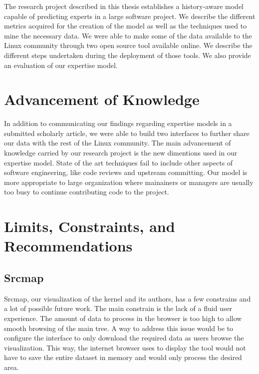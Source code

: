 \label{sec:Conclusion}


The research project described in this thesis establishes a history-aware model capable of predicting experts in a large software project. We describe the different metrics acquired for the creation of the model as well as the techniques used to mine the necessary data. We were able to make some of the data available to the Linux community through two open source tool available online. We describe the different steps undertaken during the deployment of those tools. We also provide an evaluation of our expertise model.


\section{Advancement of Knowledge}


In addition to communicating our findings regarding expertise models in a submitted scholarly article, we were able to build two interfaces to further share our data with the rest of the Linux community. The main advancement of knowledge carried by our research project is the new dimentions used in our expertise model. State of the art techniques fail to include other aspects of software engineering, like code reviews and upstream committing. Our model is more appropriate to large organization where mainainers or managers are usually too busy to continue contributing code to the project. 

\section{Limits, Constraints, and Recommendations}
\label{sec:Limits and constraints}



\subsection{Srcmap}

Srcmap, our visualization of the kernel and its authors, has a few constrains and a lot of possible future work. The main constrain is the lack of a fluid user experience. The amount of data to process in the browser is too high to allow smooth browsing of the main tree. A way to address this issue would be to configure the interface to only download the required data as users browse the visualization. This way, the internet browser uses to display the tool would not have to save the entire dataset in memory and would only process the desired area. 



